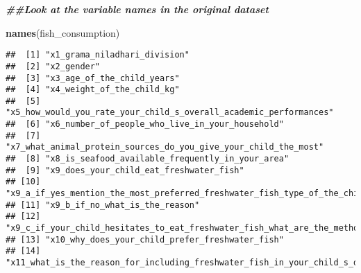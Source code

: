 \documentclass[
]{article}
\newenvironment{Shaded}{\begin{snugshade}}{\end{snugshade}}
\newcommand{\DocumentationTok}[1]{\textcolor[rgb]{0.56,0.35,0.01}{\textbf{\textit{#1}}}}
\newcommand{\FunctionTok}[1]{\textcolor[rgb]{0.13,0.29,0.53}{\textbf{#1}}}
\newcommand{\NormalTok}[1]{#1}
\begin{document}
\begin{Shaded}
\begin{Highlighting}[]
\DocumentationTok{\#\#Look at the variable names in the original dataset}

\FunctionTok{names}\NormalTok{(fish\_consumption)}
\end{Highlighting}
\end{Shaded}

\begin{verbatim}
##  [1] "x1_grama_niladhari_division"                                                                                                                 
##  [2] "x2_gender"                                                                                                                                   
##  [3] "x3_age_of_the_child_years"                                                                                                                   
##  [4] "x4_weight_of_the_child_kg"                                                                                                                   
##  [5] "x5_how_would_you_rate_your_child_s_overall_academic_performances"                                                                            
##  [6] "x6_number_of_people_who_live_in_your_household"                                                                                              
##  [7] "x7_what_animal_protein_sources_do_you_give_your_child_the_most"                                                                              
##  [8] "x8_is_seafood_available_frequently_in_your_area"                                                                                             
##  [9] "x9_does_your_child_eat_freshwater_fish"                                                                                                      
## [10] "x9_a_if_yes_mention_the_most_preferred_freshwater_fish_type_of_the_child"                                                                    
## [11] "x9_b_if_no_what_is_the_reason"                                                                                                               
## [12] "x9_c_if_your_child_hesitates_to_eat_freshwater_fish_what_are_the_methods_you_used_to_encourage_improve_their_consumption_usually"            
## [13] "x10_why_does_your_child_prefer_freshwater_fish"                                                                                              
## [14] "x11_what_is_the_reason_for_including_freshwater_fish_in_your_child_s_diet"                                                                   

\end{verbatim}
\end{document}
